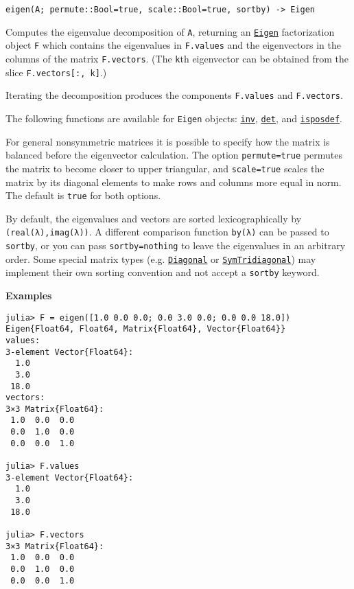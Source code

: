 \begin{adjustwidth}{2em}{0pt}


\begin{verbatim}
eigen(A; permute::Bool=true, scale::Bool=true, sortby) -> Eigen
\end{verbatim}

Computes the eigenvalue decomposition of \texttt{A}, returning an \hyperlink{2476442734611677039}{\texttt{Eigen}} factorization object \texttt{F} which contains the eigenvalues in \texttt{F.values} and the eigenvectors in the columns of the matrix \texttt{F.vectors}. (The \texttt{k}th eigenvector can be obtained from the slice \texttt{F.vectors[:, k]}.)

Iterating the decomposition produces the components \texttt{F.values} and \texttt{F.vectors}.

The following functions are available for \texttt{Eigen} objects: \hyperlink{13336866048543706848}{\texttt{inv}}, \hyperlink{16543378577000914469}{\texttt{det}}, and \hyperlink{13841568437070319804}{\texttt{isposdef}}.

For general nonsymmetric matrices it is possible to specify how the matrix is balanced before the eigenvector calculation. The option \texttt{permute=true} permutes the matrix to become closer to upper triangular, and \texttt{scale=true} scales the matrix by its diagonal elements to make rows and columns more equal in norm. The default is \texttt{true} for both options.

By default, the eigenvalues and vectors are sorted lexicographically by \texttt{(real(λ),imag(λ))}. A different comparison function \texttt{by(λ)} can be passed to \texttt{sortby}, or you can pass \texttt{sortby=nothing} to leave the eigenvalues in an arbitrary order.   Some special matrix types (e.g. \hyperlink{3300114559258360989}{\texttt{Diagonal}} or \hyperlink{6062797780727203318}{\texttt{SymTridiagonal}}) may implement their own sorting convention and not accept a \texttt{sortby} keyword.

\textbf{Examples}


\begin{verbatim}
julia> F = eigen([1.0 0.0 0.0; 0.0 3.0 0.0; 0.0 0.0 18.0])
Eigen{Float64, Float64, Matrix{Float64}, Vector{Float64}}
values:
3-element Vector{Float64}:
  1.0
  3.0
 18.0
vectors:
3×3 Matrix{Float64}:
 1.0  0.0  0.0
 0.0  1.0  0.0
 0.0  0.0  1.0

julia> F.values
3-element Vector{Float64}:
  1.0
  3.0
 18.0

julia> F.vectors
3×3 Matrix{Float64}:
 1.0  0.0  0.0
 0.0  1.0  0.0
 0.0  0.0  1.0


\end{verbatim}
\end{adjustwidth}

